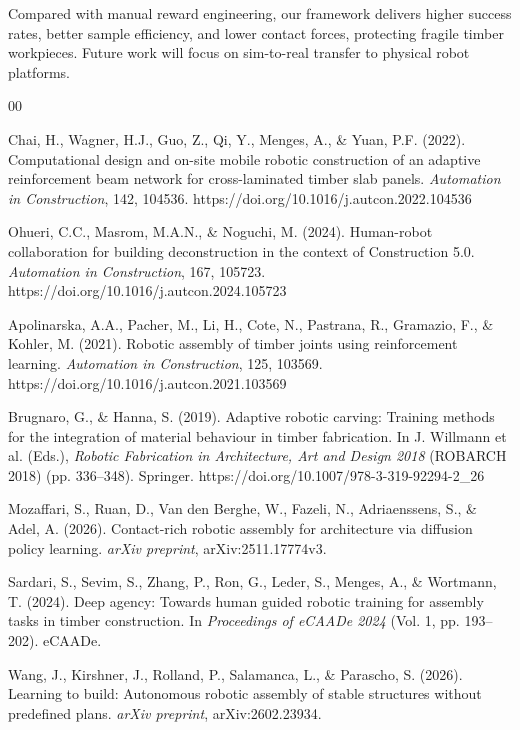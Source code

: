 \documentclass[conference]{IEEEtran}
\begin{document}
Compared with manual reward engineering, our framework delivers higher success rates, better sample efficiency, and lower contact forces, protecting fragile timber workpieces. Future work will focus on sim-to-real transfer to physical robot platforms.
\begin{thebibliography}{00}

 Chai, H., Wagner, H.J., Guo, Z., Qi, Y., Menges, A., \& Yuan, P.F. (2022). Computational design and on-site mobile robotic construction of an adaptive reinforcement beam network for cross-laminated timber slab panels. \textit{Automation in Construction}, 142, 104536. https://doi.org/10.1016/j.autcon.2022.104536

 Ohueri, C.C., Masrom, M.A.N., \& Noguchi, M. (2024). Human-robot collaboration for building deconstruction in the context of Construction 5.0. \textit{Automation in Construction}, 167, 105723. https://doi.org/10.1016/j.autcon.2024.105723

 Apolinarska, A.A., Pacher, M., Li, H., Cote, N., Pastrana, R., Gramazio, F., \& Kohler, M. (2021). Robotic assembly of timber joints using reinforcement learning. \textit{Automation in Construction}, 125, 103569. https://doi.org/10.1016/j.autcon.2021.103569

 Brugnaro, G., \& Hanna, S. (2019). Adaptive robotic carving: Training methods for the integration of material behaviour in timber fabrication. In J. Willmann et al. (Eds.), \textit{Robotic Fabrication in Architecture, Art and Design 2018} (ROBARCH 2018) (pp. 336--348). Springer. https://doi.org/10.1007/978-3-319-92294-2\_26

 Mozaffari, S., Ruan, D., Van den Berghe, W., Fazeli, N., Adriaenssens, S., \& Adel, A. (2026). Contact-rich robotic assembly for architecture via diffusion policy learning. \textit{arXiv preprint}, arXiv:2511.17774v3.

 Sardari, S., Sevim, S., Zhang, P., Ron, G., Leder, S., Menges, A., \& Wortmann, T. (2024). Deep agency: Towards human guided robotic training for assembly tasks in timber construction. In \textit{Proceedings of eCAADe 2024} (Vol. 1, pp. 193--202). eCAADe.

 Wang, J., Kirshner, J., Rolland, P., Salamanca, L., \& Parascho, S. (2026). Learning to build: Autonomous robotic assembly of stable structures without predefined plans. \textit{arXiv preprint}, arXiv:2602.23934.


\end{thebibliography}
\end{document}
